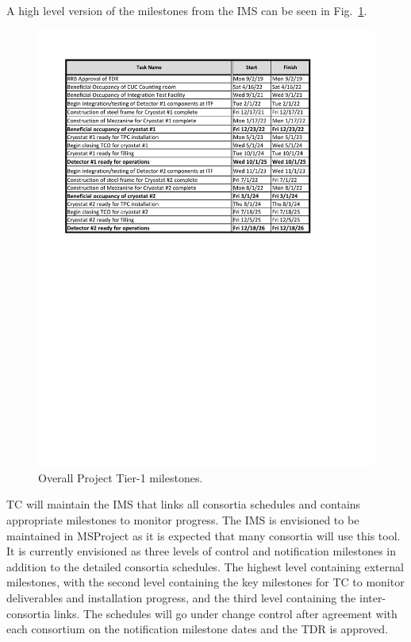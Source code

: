 A high level version of the  milestones from the IMS
can be seen in Fig.~\ref{fig:DUNE_schedule}.
\begin{figure}[htb]
  \begin{center}
    \includegraphics[width=\textwidth]{far-detector-generic/figures/FD_Cnst_Schedule}
    \caption{Overall  Project Tier-1 milestones.}
    \label{fig:DUNE_schedule}
  \end{center}
\end{figure}
TC will maintain the IMS that links all consortia schedules
and contains appropriate milestones to monitor progress. The IMS
is envisioned to be maintained in MSProject as it is expected
that many consortia will use this tool. It is currently envisioned as
three levels of control and notification milestones in addition to the
detailed consortia schedules. The highest level containing external
milestones, with the second level containing the key milestones for TC
to monitor deliverables and installation progress, and the third level
containing the inter-consortia links. The schedules will go
under change control after agreement with each consortium on the
notification milestone dates and the TDR is approved.


